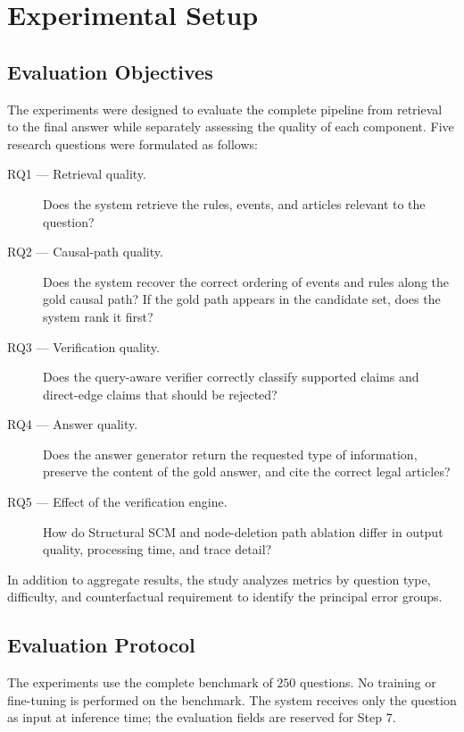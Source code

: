 \section{Experimental Setup}
\label{sec:experimental-setup}

\subsection{Evaluation Objectives}

The experiments were designed to evaluate the complete pipeline from
retrieval to the final answer while separately assessing the quality of each
component. Five research questions were formulated as follows:

\begin{description}
    \item[RQ1 --- Retrieval quality.]
    Does the system retrieve the rules, events, and articles relevant to the
    question?

    \item[RQ2 --- Causal-path quality.]
    Does the system recover the correct ordering of events and rules along the
    gold causal path? If the gold path appears in the candidate set, does the
    system rank it first?

    \item[RQ3 --- Verification quality.]
    Does the query-aware verifier correctly classify supported claims and
    direct-edge claims that should be rejected?

    \item[RQ4 --- Answer quality.]
    Does the answer generator return the requested type of information,
    preserve the content of the gold answer, and cite the correct legal
    articles?

    \item[RQ5 --- Effect of the verification engine.]
    How do Structural SCM and node-deletion path ablation differ in output
    quality, processing time, and trace detail?
\end{description}

In addition to aggregate results, the study analyzes metrics by question type,
difficulty, and counterfactual requirement to identify the principal error
groups.

\subsection{Evaluation Protocol}

The experiments use the complete benchmark of \(250\) questions. No training
or fine-tuning is performed on the benchmark. The system receives only the
question as input at inference time; the evaluation fields are reserved for
Step 7.

